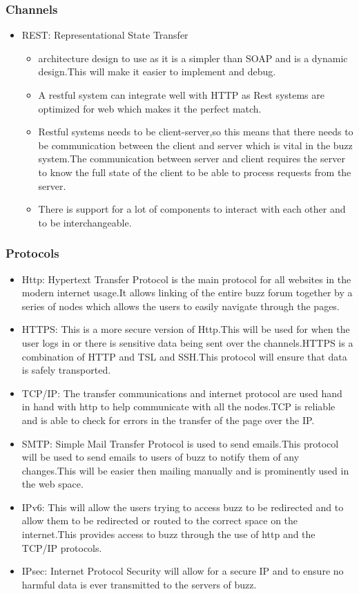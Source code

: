 
\subsubsection{Channels}
\begin{itemize}
\item REST: Representational State Transfer
\begin{itemize}
\item architecture design to use as it is a simpler than SOAP and is a dynamic design.This will make it easier to implement and debug.
\item A restful system can integrate well with HTTP as Rest systems are optimized for web which makes it the perfect match.
\item Restful systems needs to be client-server,so this means that there needs to be communication between the client and server which is vital in the buzz system.The communication between server and client requires the server to know the full state of the client to be able to process requests from the server.
\item There is support for a lot of components to interact with each other and to be interchangeable.
\end{itemize}
\end{itemize}
\subsubsection{Protocols}
\begin{itemize}
\item Http: Hypertext Transfer Protocol is the main protocol for all websites in the modern internet usage.It allows linking of the entire buzz forum together by a series of nodes which allows the users to easily navigate through the pages.
\item HTTPS: This is a more secure version of Http.This will be used for when the user logs in or there is sensitive data being sent over the channels.HTTPS is a combination of HTTP and TSL and SSH.This protocol will ensure that data is safely transported.
\item TCP/IP: The transfer communications and internet protocol are used hand in hand with http to help communicate with all the nodes.TCP is reliable and is able to check for errors in the transfer of the page over the IP.
\item SMTP: Simple Mail Transfer Protocol is used to send emails.This protocol will be used to send emails to users of buzz to notify them of any changes.This will be easier then mailing manually and is prominently used in the web space.
\item IPv6: This will allow the users trying to  access buzz to be redirected and to allow them to be redirected or routed to the correct space on the internet.This provides access to buzz through the use of http and the TCP/IP protocols.
\item IPsec: Internet Protocol Security will allow for a secure IP and to ensure no harmful data is ever transmitted to the servers of buzz.
\end{itemize}

